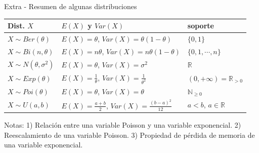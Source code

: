 \documentclass{beamer}
\theoremstyle{definition}
\newcommand{\RR}{\mathbb{R}}
\begin{document}
\begin{frame}{\color{rosee}Extra - Resumen de algunas distribuciones}
     \begin{table}[h!]
        \centering
        \begin{tabularx}{\linewidth}{|>{\hsize=0.5\hsize}X|>{\hsize=1\hsize}X|>{\hsize=0.5\hsize}X|}
        \hline
     Dist. $X$ &  $E(X)$ y $Var(X)$ & soporte  \\
         \hline
     $X \sim Ber(\theta)$ & $E(X)=\theta$, $Var(X)=\theta(1-\theta)$ &$\{0,1\}$\\
      \hline
     $X \sim Bi(n,\theta)$ & $E(X)=n\theta$, $Var(X)=n\theta(1-\theta)$ &$\{0,1,\cdots, n\}$\\
      \hline
           $X \sim N(\theta,\sigma^2)$ & $E(X)=\theta$, $Var(X)=\sigma^2$ &$\mathbb{R}$ \\
      \hline
           $X \sim Exp(\theta)$ & $E(X)=\frac{1}{\theta}$, $Var(X)=\frac{1}{\theta^2}$ &$(0,+\infty)=\mathbb{R}_{>0}$ \\
      \hline
$X \sim Poi(\theta)$ & $E(X)=\theta$, $Var(X)=\theta$ &$\mathbb{N}_{\geqslant 0}$\\
      \hline
      $X\sim U(a,b)$& $E(X)=\frac{a+b}{2}$, $Var(X)=\frac{(b-a)^2}{12}$ & $a <b$, $a\in\RR$\\
      \hline
      \end{tabularx}
       \end{table}
    
    Notas: 1) Relación entre una variable Poisson y una variable exponencial. 2) Reescalamiento de una variable Poisson. 3) Propiedad de pérdida de memoria de una variable exponencial.
\end{frame}
\end{document}
